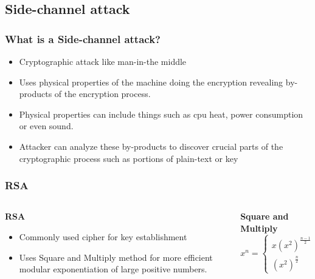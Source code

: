 \documentclass{beamer}
\begin{document}
	\subsection{Side-channel attack}
		\begin{frame}
		\frametitle{What is a Side-channel attack?}
			\begin{itemize}
			\item Cryptographic attack like man-in-the middle\\
			\item Uses physical properties of the machine doing the encryption revealing by-products of the encryption process.  \\
			\item Physical properties can include things such as cpu heat, power consumption or even sound.
			\item Attacker can analyze these by-products to discover crucial parts of the cryptographic process such as portions of plain-text or key
		\end{itemize}
		\end{frame}
		\begin{frame}
		\frametitle{RSA}
		\begin{columns}[c]
		\begin{column}{.45\textwidth}
		\textbf{RSA}
		 \begin{itemize}
		 \item Commonly used cipher for key establishment
		 \item Uses Square and Multiply method for more efficient modular exponentiation of large positive numbers.
			\end{itemize}
		 \end{column}
		 
		 \begin{column}{.45\textwidth}
		 \textbf{Square and Multiply}
		 \[x^n = \left\{
  \begin{array}{lr}
    x(x^2)^{\frac{n-1}{2}} &  \text{: if n is odd} \\
    (x^2)^{\frac{n}{2}} & \text{: if n is even}
  \end{array}
\right.
\]
		 \end{column}
		 \end{columns}
		\end{frame}
\end{document}
